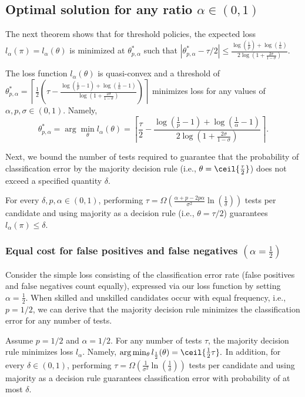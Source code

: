 \subsection*{Optimal solution for any ratio $\alpha\in(0,1)$}
%
The next theorem shows that for threshold policies, the  expected loss $l_{\alpha}(\pi)=l_{\alpha}(\theta)$ is minimized at $\theta^*_{p,\alpha}$ 
such that
$|\theta^*_{p,\alpha}-\tau/2|\leq \frac{\log (\frac{1}{p})+\log(\frac{1}{ \alpha})}{2\log(1+\frac{2\sigma}{1-\sigma})}$.
\begin{theorem}\label{thm:minErrorThresholdgeneralAlpha}
The loss function $l_{\alpha}(\theta)$ is quasi-convex and a
threshold of 
$\theta^*_{p,\alpha}=
\left\lceil\frac{1}{2}\left(\tau-\frac{\log(\frac{1}{p}-1)+\log(\frac{1}{\alpha}-1)}{\log(1+\frac{2\sigma}{1-\sigma})}\right)\right\rceil$ 
minimizes loss for any values of $\alpha,p,\sigma\in(0,1)$.
Namely,
\[
\theta^*_{p,\alpha}=\arg\min_{\theta}l_{\alpha}(\theta) =\left\lceil\frac{\tau}{2}-\frac{\log(\frac{1}{p}-1)+\log(\frac{1}{\alpha}-1)}{2\log(1+\frac{2\sigma}{1-\sigma})}\right\rceil.
\]
\end{theorem}

Next, we bound the number of tests required to guarantee that
the probability of classification error by the majority decision rule (i.e., $\theta=\ceil{\frac{\tau}{2}}$) 
does not exceed a specified quantity $\delta$.


\begin{theorem}\label{thm:majorityLowerBound}
For every $\delta,p,\alpha \in(0,1)$, performing 
$\tau=\Omega(\frac{\alpha+p-2p\alpha}{\sigma^2}\ln(\frac{1}{\delta}))$ 
tests per candidate 
and using majority as a decision rule (i.e., $\theta=\tau/2$)
guarantees $l_{\alpha}(\pi)\leq \delta$.
\end{theorem}

\subsubsection*{Equal cost for false positives and false negatives $(\alpha=\frac{1}{2})$}

Consider the simple loss consisting of the classification error rate 
(false positives and false negatives count equally), 
expressed via our loss function by setting $\alpha=\frac{1}{2}$. 
When skilled and unskilled candidates 
occur with equal frequency, i.e., $p=1/2$, 
we can derive that the majority decision rule 
minimizes the classification error 
for any number of tests.

\begin{corollary}\label{cor:majorityMinError}
Assume  $p=1/2$ and $\alpha=1/2$. 
For any number of tests $\tau$, 
the majority decision rule minimizes loss $l_\alpha$.
Namely,
$\arg\min_{\theta}l_{\frac{1}{2}}(\theta) =\ceil{\frac{1}{2}\tau}.$
In addition, for every $\delta\in(0,1)$, 
performing $\tau=\Omega(\frac{1}{\sigma^2}\ln(\frac{1}{\delta}))$ tests per candidate 
and using majority as a decision rule 
guarantees classification error with probability of at most $\delta$.
\end{corollary}



